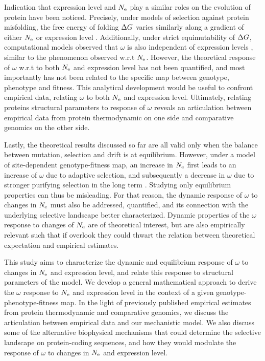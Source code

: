 \documentclass{MBE}%
\begin{document}
Indication that expression level and $N_{\mathrm{e}}$ play a similar roles on the evolution of protein have been noticed.
Precisely, under models of selection against protein misfolding, the free energy of folding $\Delta G$ varies similarly along a gradient of either $N_{\mathrm{e}}$ or expression level \citep{Serohijos2013}.
Additionally, under strict equimutability of $\Delta G$, computational models observed that $\omega$ is also independent of expression levels \citep{Serohijos2012}, similar to the phenomenon observed w.r.t $N_{\mathrm{e}}$.
However, the theoretical response of $\omega$ w.r.t to both $N_{\mathrm{e}}$ and expression level has not been quantified, and most importantly has not been related to the specific map between genotype, phenotype and fitness.
This analytical development would be useful to confront empirical data, relating $\omega$ to both $N_{\mathrm{e}}$ and expression level.
Ultimately, relating proteins structural parameters to response of $\omega$ reveals an articulation between empirical data from protein thermodynamic on one side and comparative genomics on the other side. 

Lastly, the theoretical results discussed so far are all valid only when the balance between mutation, selection and drift is at equilibrium.
However, under a model of site-dependent genotype-fitness map, an increase in $N_{\mathrm{e}}$ first leads to an increase of $\omega$ due to adaptive selection, and subsequently a decrease in $\omega$ due to stronger purifying selection in the long term \citep{Jones2016}.
Studying only equilibrium properties can thus be misleading.
For that reason, the dynamic response of $\omega$ to changes in $N_{\mathrm{e}}$ must also be addressed, quantified, and its connection with the underlying selective landscape better characterized.
Dynamic properties of the $\omega$ response to changes of $N_{\mathrm{e}}$ are of theoretical interest, but are also empirically relevant such that if overlook they could thwart the relation between theoretical expectation and empirical estimates.

This study aims to characterize the dynamic and equilibrium response of $\omega$ to changes in $N_{\mathrm{e}}$ and expression level, and relate this response to structural parameters of the model.
We develop a general mathematical approach to derive the $\omega$ response to $N_{\mathrm{e}}$ and expression level in the context of a given genotype-phenotype-fitness map.
In the light of previously published empirical estimates from protein thermodynamic and comparative genomics, we discuss the articulation between empirical data and our mechanistic model.
We also discuss some of the alternative biophysical mechanisms that could determine the selective landscape on protein-coding sequences, and how they would modulate the response of $\omega$ to changes in $N_{\mathrm{e}}$ and expression level.
\end{document}
